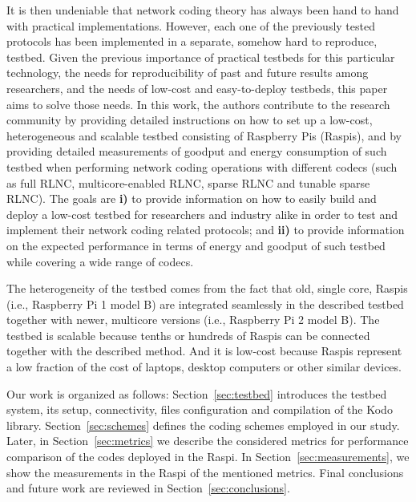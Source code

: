 It is then undeniable that network coding theory has always been hand to hand
with practical implementations. However, each one of the previously tested
protocols has been implemented in a separate, somehow hard to reproduce,
testbed. Given the previous importance of practical testbeds for this particular
technology, the needs for reproducibility of past and future results among
researchers, and the needs of low-cost and easy-to-deploy testbeds, this paper
aims to solve those needs. In this work, the authors contribute to the research
community by providing detailed instructions on how to set up a low-cost,
heterogeneous and scalable testbed consisting of Raspberry Pis (Raspis), and by
providing detailed measurements of goodput and energy consumption of such
testbed when performing network coding operations with different codecs (such as
full RLNC, multicore-enabled RLNC, sparse RLNC and tunable sparse RLNC). The
goals are \textbf{i)} to provide information on how to easily build and deploy a
low-cost testbed for researchers and industry alike in order to test and
implement their network coding related protocols; and \textbf{ii)} to provide
information on the expected performance in terms of energy and goodput of such
testbed while covering a wide range of codecs.

The heterogeneity of the testbed comes from the fact that old, single core,
Raspis (i.e., Raspberry Pi 1 model B) are integrated seamlessly in the described
testbed together with newer, multicore versions (i.e., Raspberry Pi 2 model B).
The testbed is scalable because tenths or hundreds of Raspis can be connected
together with the described method. And it is low-cost because Raspis represent
a low fraction of the cost of laptops, desktop computers or other similar
devices. 

Our work is organized as follows: Section~\ref{sec:testbed} introduces the
testbed system, its setup, connectivity, files configuration and compilation of
the Kodo library. Section~\ref{sec:schemes} defines the coding schemes employed
in our study. Later, in Section~\ref{sec:metrics} we describe the considered
metrics for performance comparison of the codes deployed in the \ac{Raspi}. In
Section~\ref{sec:measurements}, we show the measurements in the \ac{Raspi} of
the mentioned metrics. Final conclusions and future work are reviewed in
Section~\ref{sec:conclusions}.


